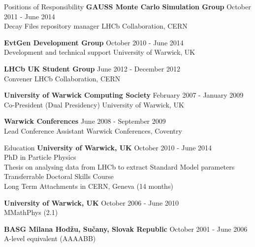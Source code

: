 \documentclass{format/resume} %
\begin{document}

\begin{rSection}{Positions of Responsibility}
  {\bf GAUSS Monte Carlo Simulation Group} \hfill { October 2011 - June 2014} \\
  {Decay Files repository manager} \hfill {LHCb Collaboration, CERN}

  {\bf EvtGen Development Group} \hfill { October 2010 - June 2014 } \\
  {Development and technical support} \hfill {University of Warwick, UK}

  {\bf LHCb UK Student Group} \hfill { June 2012 - December 2012 } \\
  {Convener} \hfill {LHCb Collaboration, CERN}

  {\bf University of Warwick Computing Society} \hfill { February 2007 - January 2009 } \\
  {Co-President (Dual Presidency)} \hfill {University of Warwick, UK}

  {\bf Warwick Conferences} \hfill { June 2008 - September 2009} \\
  { Lead Conference Assistant} \hfill {Warwick Conferences, Coventry}

\end{rSection}

\newpage


\begin{rSection}{Education}
  {\bf University of Warwick, UK} \hfill {October 2010 - June 2014} \\
  PhD in Particle Physics \\
  Thesis on analysing data from LHCb to extract Standard Model parameters\\
  Transferrable Doctoral Skills Course \\
  Long Term Attachments in CERN, Geneva (14 months)

  {\bf University of Warwick, UK} \hfill {October 2006 - June 2010} \\
  MMathPhys (2.1)

  {\bf BASG Milana Hod\v{z}u, Su\v{c}any, Slovak Republic} \hfill {October 2001 - June 2006} \\
  A-level equivalent (AAAABB)
\end{rSection}
\end{document}
